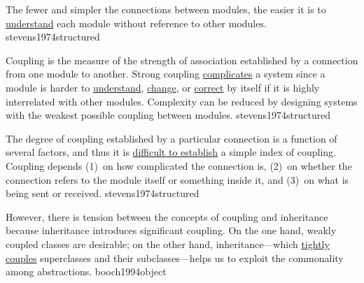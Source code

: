 \documentclass{article}
\begin{document}


  {The fewer and simpler the connections between modules, the easier it is to \ul{understand} each module without reference to other modules.}
  {stevens1974structured}


  {Coupling is the measure of the strength of association established by a connection from one module to another. Strong coupling \ul{complicates} a system since a module is harder to \ul{understand}, \ul{change}, or \ul{correct} by itself if it is highly interrelated with other modules. Complexity can be reduced by designing systems with the weakest possible coupling between modules.}
  {stevens1974structured}


  {The degree of coupling established by a particular connection is a function of several factors, and thus it is \ul{difficult to establish} a simple index of coupling. Coupling depends (1)~on how complicated the connection is, (2)~on whether the connection refers to the module itself or something inside it, and (3)~on what is being sent or received.}
  {stevens1974structured}



  {However, there is tension between the concepts of coupling and inheritance because inheritance introduces significant coupling. On the one hand, weakly coupled classes are desirable; on the other hand, inheritance---which \ul{tightly couples} superclasses and their subclasses---helps us to exploit the commonality among abstractions.}
  {booch1994object}
\end{document}
